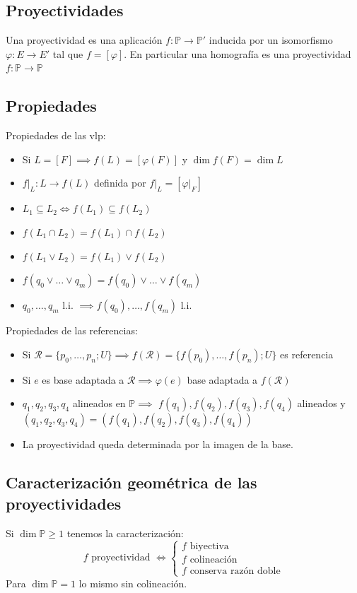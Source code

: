 \documentclass{myclass}
\newcommand{\R}{\mathcal{R}}
\renewcommand{\phi}{\varphi}
\renewcommand{\P}{\mathbb{P}}
\begin{document}
\subsection{Proyectividades}
Una proyectividad es una aplicación $f:\P \to \P'$ inducida por un isomorfismo  $\varphi:E\to E'$ tal que  $f=[\varphi]$. En particular una homografía es una proyectividad $f:\P\to \P$

\subsection{Propiedades}
Propiedades de las vlp:
\begin{itemize}
    \item Si $L = [F] \implies f(L) =  [\phi(F)]$ y $\dim f(F) = \dim L$
    \item $f|_L: L\to f(L)$ definida por $f|_L = [\phi|_F]$
    \item $L_1\subseteq L_2 \iff f(L_1) \subseteq f(L_2)$
    \item $f(L_1\cap L_2) = f(L_1)\cap f(L_2)$
    \item $f(L_1\vee L_2) = f(L_1)\vee f(L_2)$
    \item $f(q_0\vee \ldots \vee q_m) = f(q_0)\vee \ldots \vee f(q_m)$
    \item $q_0, \ldots, q_m$ l.i. $\implies f(q_0), \ldots, f(q_m)$ l.i.
\end{itemize}
Propiedades de las referencias:
\begin{itemize}
    \item Si $\R = \{p_0, \ldots, p_n; U\} \implies f(\R)=\{f(p_0), \ldots, f(p_n); U\}$ es referencia
	\item Si $e$ es base adaptada a $\mathcal{R} \implies \phi(e)$ base adaptada a $f(\mathcal{R})$ 
	\item $q_1, q_2, q_3, q_4$ alineados en $\P \implies$ $f(q_1), f(q_2), f(q_3), f(q_4)$ alineados y $(q_1, q_2, q_3, q_4) = (f(q_1), f(q_2), f(q_3), f(q_4))$
	\item La proyectividad queda determinada por la imagen de la base.
\end{itemize}

\subsection{Caracterización geométrica de las proyectividades}
Si $\dim\P\ge 1$ tenemos la caracterización:
\[
  f \text{ proyectividad } \iff \begin{cases}
  f \text{ biyectiva} \\
  f \text{ colineación} \\
  f \text{ conserva razón doble}
\end{cases}
\]
Para $\dim \P = 1$ lo mismo sin colineación.
\end{document}
